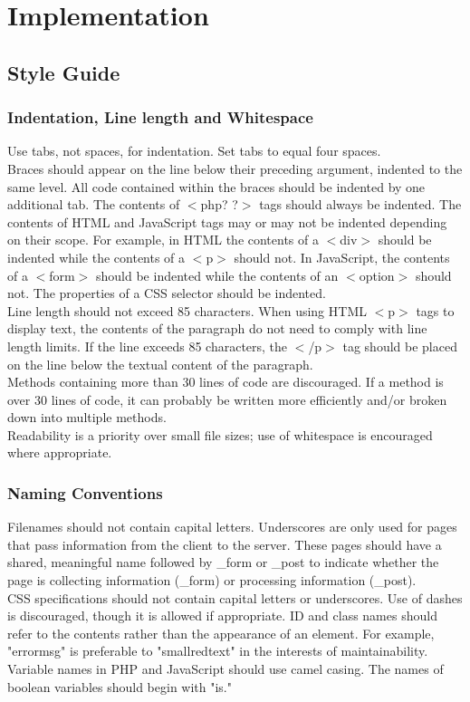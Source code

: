 
\section{Implementation}
	\subsection{Style Guide}
		\subsubsection{Indentation, Line length and Whitespace}
			Use tabs, not spaces, for indentation. Set tabs to equal four spaces.\\Braces should appear on the line below their preceding argument, indented to the same level. All code contained within the braces should be indented by one additional tab. The contents of $<$php? ?$>$ tags should always be indented. The contents of HTML and JavaScript tags may or may not be indented depending on their scope. For example, in HTML the contents of a $<$div$>$ should be indented while the contents of a $<$p$>$ should not. In JavaScript, the contents of a $<$form$>$ should be indented while the contents of an $<$option$>$ should not. The properties of a CSS selector should be indented.\\Line length should not exceed 85 characters. When using HTML $<$p$>$ tags to display text, the contents of the paragraph do not need to comply with line length limits. If the line exceeds 85 characters, the $<$/p$>$ tag should be placed on the line below the textual content of the paragraph.\\Methods containing more than 30 lines of code are discouraged. If a method is over 30 lines of code, it can probably be written more efficiently and/or broken down into multiple methods.\\Readability is a priority over small file sizes; use of whitespace is encouraged where appropriate.
			
		\subsubsection{Naming Conventions}
		Filenames should not contain capital letters. Underscores are only used for pages that pass information from the client to the server. These pages should have a shared, meaningful name followed by \_form or \_post to indicate whether the page is collecting information (\_form) or processing information (\_post).\\CSS specifications should not contain capital letters or underscores. Use of dashes is discouraged, though it is allowed if appropriate. ID and class names should refer to the contents rather than the appearance of an element. For example, "errormsg" is preferable to "smallredtext" in the interests of maintainability.\\Variable names in PHP and JavaScript should use camel casing. The names of boolean variables should begin with "is."
			
